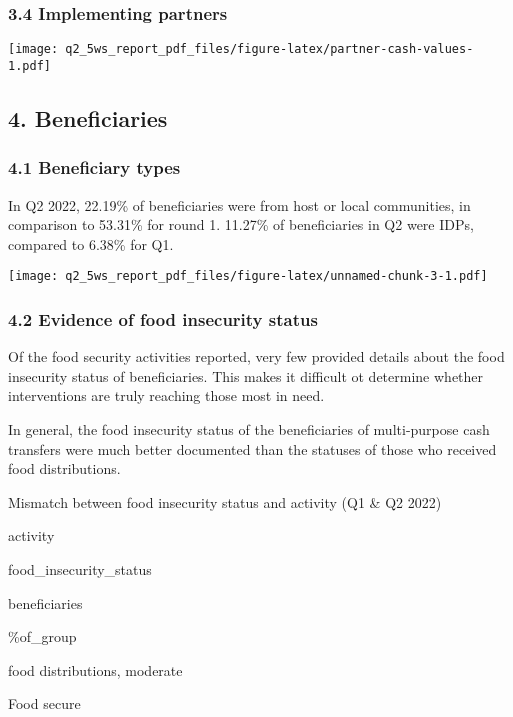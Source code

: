 \documentclass[
]{article}
\begin{document}
\hypertarget{implementing-partners}{%
\subsubsection{3.4 Implementing partners}\label{implementing-partners}}

\texttt{[image: q2\_5ws\_report\_pdf\_files/figure-latex/partner-cash-values-1.pdf]}

\hypertarget{beneficiaries}{%
\subsection{4. Beneficiaries}\label{beneficiaries}}

\hypertarget{beneficiary-types}{%
\subsubsection{4.1 Beneficiary types}\label{beneficiary-types}}

In Q2 2022, 22.19\% of beneficiaries were from host or local
communities, in comparison to 53.31\% for round 1. 11.27\% of
beneficiaries in Q2 were IDPs, compared to 6.38\% for Q1.

\texttt{[image: q2\_5ws\_report\_pdf\_files/figure-latex/unnamed-chunk-3-1.pdf]}

\hypertarget{evidence-of-food-insecurity-status}{%
\subsubsection{4.2 Evidence of food insecurity
status}\label{evidence-of-food-insecurity-status}}

Of the food security activities reported, very few provided details
about the food insecurity status of beneficiaries. This makes it
difficult ot determine whether interventions are truly reaching those
most in need.

In general, the food insecurity status of the beneficiaries of
multi-purpose cash transfers were much better documented than the
statuses of those who received food distributions.

Mismatch between food insecurity status and activity (Q1 \& Q2 2022)

activity

food\_insecurity\_status

beneficiaries

\%of\_group

food distributions, moderate

Food secure
\end{document}
